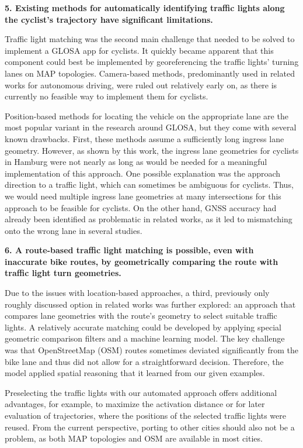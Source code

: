 \textbf{\color{cidarkblue}5. Existing methods for automatically identifying traffic lights along the cyclist's trajectory have significant limitations.} 

Traffic light matching was the second main challenge that needed to be solved to implement a GLOSA app for cyclists. It quickly became apparent that this component could best be implemented by georeferencing the traffic lights' turning lanes on MAP topologies. Camera-based methods, predominantly used in related works for autonomous driving, were ruled out relatively early on, as there is currently no feasible way to implement them for cyclists. 

Position-based methods for locating the vehicle on the appropriate lane are the most popular variant in the research around GLOSA, but they come with several known drawbacks. First, these methods assume a sufficiently long ingress lane geometry. However, as shown by this work, the ingress lane geometries for cyclists in Hamburg were not nearly as long as would be needed for a meaningful implementation of this approach. One possible explanation was the approach direction to a traffic light, which can sometimes be ambiguous for cyclists. Thus, we would need multiple ingress lane geometries at many intersections for this approach to be feasible for cyclists. On the other hand, GNSS accuracy had already been identified as problematic in related works, as it led to mismatching onto the wrong lane in several studies.

\textbf{\color{cidarkblue}6. A route-based traffic light matching is possible, even with inaccurate bike routes, by geometrically comparing the route with traffic light turn geometries.}

Due to the issues with location-based approaches, a third, previously only roughly discussed option in related works was further explored: an approach that compares lane geometries with the route's geometry to select suitable traffic lights. A relatively accurate matching could be developed by applying special geometric comparison filters and a machine learning model. The key challenge was that OpenStreetMap (OSM) routes sometimes deviated significantly from the bike lane and thus did not allow for a straightforward decision. Therefore, the model applied spatial reasoning that it learned from our given examples.

Preselecting the traffic lights with our automated approach offers additional advantages, for example, to maximize the activation distance or for later evaluation of trajectories, where the positions of the selected traffic lights were reused. From the current perspective, porting to other cities should also not be a problem, as both MAP topologies and OSM are available in most cities. 


